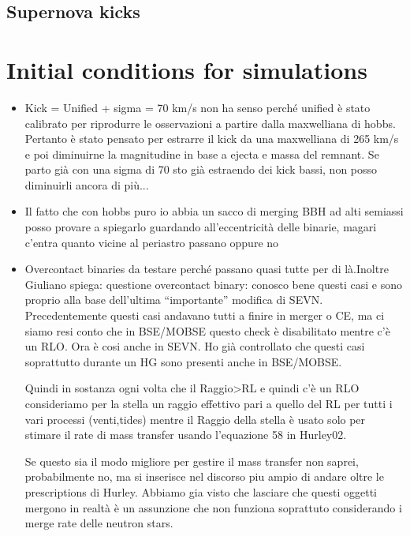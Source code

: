 \documentclass[a4paper,titlepage]{book}     	%
\begin{document}
\subsection{Supernova kicks}\label{subsec:kicksSEVN}


\section{Initial conditions for simulations}









\begin{itemize}
	\item Kick = Unified + sigma = 70 km/s non ha senso perché unified è stato calibrato per riprodurre le osservazioni a partire dalla maxwelliana di hobbs. Pertanto è stato pensato per estrarre il kick da una maxwelliana di 265 km/s e poi diminuirne la magnitudine in base a ejecta e massa del remnant. Se parto già con una sigma di 70 sto già estraendo dei kick bassi, non posso diminuirli ancora di più...
	\item Il fatto che con hobbs puro io abbia un sacco di merging BBH ad alti semiassi posso provare a spiegarlo guardando all'eccentricità delle binarie, magari c'entra quanto vicine al periastro passano oppure no
	\item Overcontact binaries da testare perché passano quasi tutte per di là.Inoltre Giuliano spiega: questione overcontact binary: conosco bene questi casi e sono proprio alla base dell’ultima “importante” modifica di SEVN. 
	Precedentemente questi casi andavano tutti a finire in merger o CE, ma ci siamo resi conto che in BSE/MOBSE questo check è disabilitato mentre c’è un RLO. Ora è cosi anche in SEVN. 
	Ho già controllato che questi casi soprattutto durante un HG sono presenti anche in BSE/MOBSE. 
	
	Quindi in sostanza ogni volta che il Raggio>RL e quindi c’è un RLO consideriamo per la stella  un raggio effettivo pari a quello del RL per tutti i vari processi (venti,tides) mentre il Raggio della stella è usato 
	solo per stimare il rate di mass transfer usando l’equazione 58 in Hurley02.
	
	Se questo sia il modo migliore per gestire il mass transfer non saprei, probabilmente no, ma si inserisce nel discorso piu ampio di andare oltre le prescriptions di Hurley. 
	Abbiamo gia visto che lasciare che questi oggetti mergono in realtà è un assunzione che non funziona soprattuto considerando i merge rate delle neutron stars. 
	

\end{itemize}
\end{document}
